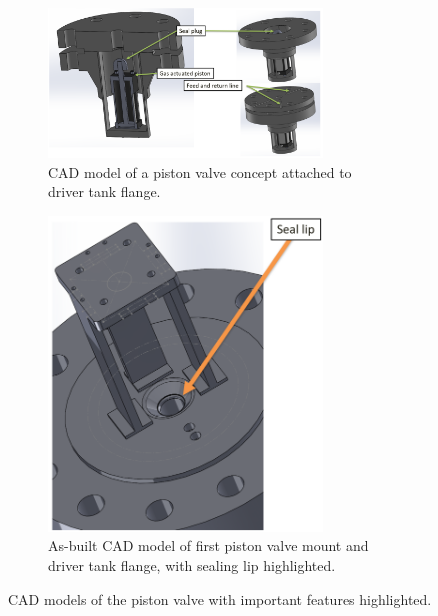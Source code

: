 \begin{figure}[tb]
    \vspace{16pt}
    \centering
    \begin{subfigure}[t]{0.6\textwidth}
        \centering
        \includegraphics[width=0.8\textwidth]{design/photos/PistonValve_Gen1_CAD_labels.PNG}
        \caption{CAD model of a piston valve concept attached to driver tank flange.}
        \label{fig:cad concept}
    \end{subfigure}
    \hfill
    \begin{subfigure}[t]{0.35\textwidth}
        \centering
        \includegraphics[width=0.8\textwidth]{design/photos/PistonMount_CAD_lip.PNG}
        \caption{As-built CAD model of first piston valve mount and driver tank flange, with sealing lip highlighted.}
        \label{fig:cad lip}
    \end{subfigure}
    \caption{CAD models of the piston valve with important features highlighted.}
    \label{fig:cad gen 1}
    \vspace{16pt}
\end{figure}

